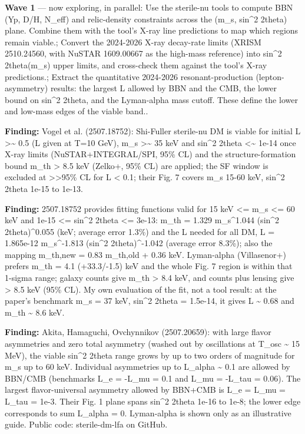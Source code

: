 \documentclass[11pt,a4paper]{article}
\begin{document}
\textbf{Wave 1} --- now exploring, in parallel: Use the sterile-nu tools to compute BBN (Yp, D/H, N\_eff) and relic-density constraints across the (m\_s, sin\textasciicircum{}2 2theta) plane. Combine them with the tool's X-ray line predictions to map which regions remain viable.; Convert the 2024-2026 X-ray decay-rate limits (XRISM 2510.24560, with NuSTAR 1609.00667 as the high-mass reference) into sin\textasciicircum{}2 2theta(m\_s) upper limits, and cross-check them against the tool's X-ray predictions.; Extract the quantitative 2024-2026 resonant-production (lepton-asymmetry) results: the largest L allowed by BBN and the CMB, the lower bound on sin\textasciicircum{}2 2theta, and the Lyman-alpha mass cutoff. These define the lower and low-mass edges of the viable band..

\textbf{Finding:} Vogel et al. (2507.18752): Shi-Fuller sterile-nu DM is viable for initial L \textgreater{}\textasciitilde{} 0.5 (L given at T=10 GeV), m\_s \textgreater{}\textasciitilde{} 35 keV and sin\textasciicircum{}2 2theta \textless{}\textasciitilde{} 1e-14 once X-ray limits (NuSTAR+INTEGRAL/SPI, 95\% CL) and the structure-formation bound m\_th \textgreater{} 8.5 keV (Zelko+, 95\% CL) are applied; the SF window is excluded at \textgreater{}\textgreater{}95\% CL for L \textless{} 0.1; their Fig. 7 covers m\_s 15-60 keV, sin\textasciicircum{}2 2theta 1e-15 to 1e-13.

\textbf{Finding:} 2507.18752 provides fitting functions valid for 15 keV \textless{}= m\_s \textless{}= 60 keV and 1e-15 \textless{}= sin\textasciicircum{}2 2theta \textless{}= 3e-13: m\_th = 1.329 m\_s\textasciicircum{}1.044 (sin\textasciicircum{}2 2theta)\textasciicircum{}0.055 (keV; average error 1.3\%) and the L needed for all DM, L = 1.865e-12 m\_s\textasciicircum{}-1.813 (sin\textasciicircum{}2 2theta)\textasciicircum{}-1.042 (average error 8.3\%); also the mapping m\_th,new = 0.83 m\_th,old + 0.36 keV. Lyman-alpha (Villasenor+) prefers m\_th = 4.1 (+33.3/-1.5) keV and the whole Fig. 7 region is within that 1-sigma range; galaxy counts give m\_th \textgreater{} 8.4 keV, and counts plus lensing give \textgreater{} 8.5 keV (95\% CL). My own evaluation of the fit, not a tool result: at the paper's benchmark m\_s = 37 keV, sin\textasciicircum{}2 2theta = 1.5e-14, it gives L \textasciitilde{} 0.68 and m\_th \textasciitilde{} 8.6 keV.

\textbf{Finding:} Akita, Hamaguchi, Ovchynnikov (2507.20659): with large flavor asymmetries and zero total asymmetry (washed out by oscillations at T\_osc \textasciitilde{} 15 MeV), the viable sin\textasciicircum{}2 2theta range grows by up to two orders of magnitude for m\_s up to 60 keV. Individual asymmetries up to \textbar{}L\_alpha\textbar{} \textasciitilde{} 0.1 are allowed by BBN/CMB (benchmarks L\_e = -L\_mu = 0.1 and L\_mu = -L\_tau = 0.06). The largest flavor-universal asymmetry allowed by BBN+CMB is L\_e = L\_mu = L\_tau = 1e-3. Their Fig. 1 plane spans sin\textasciicircum{}2 2theta 1e-16 to 1e-8; the lower edge corresponds to sum L\_alpha = 0. Lyman-alpha is shown only as an illustrative guide. Public code: sterile-dm-lfa on GitHub.
\end{document}
